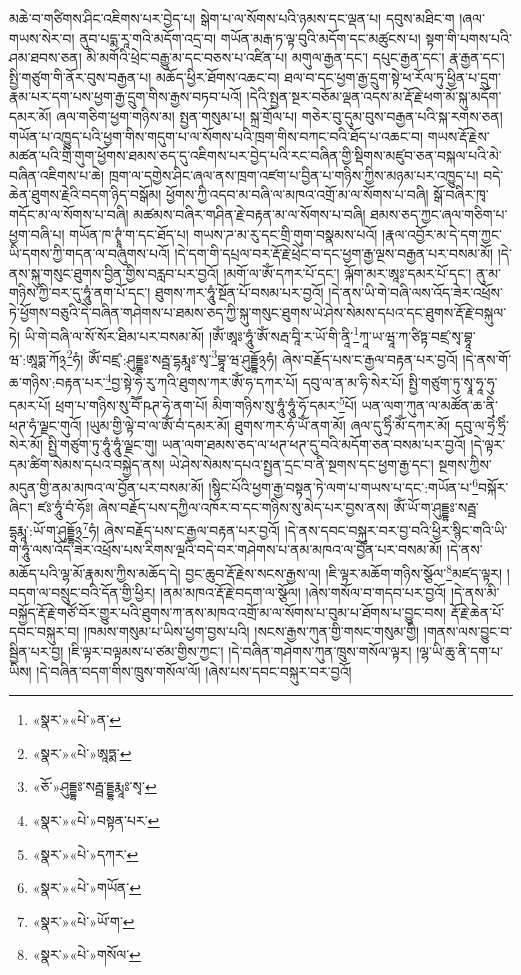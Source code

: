 མཆེ་བ་གཙིགས་ཤིང་འཇིགས་པར་བྱེད་པ། སྒེག་པ་ལ་སོགས་པའི་ཉམས་དང་ལྡན་པ། དབུས་མཐིང་ག །ཞལ་གཡས་སེར་བ། ནུབ་པདྨ་རཱ་གའི་མདོག་འདྲ་བ། གཡོན་མརྒ་ཏ་ལྟ་བུའི་མདོག་དང་མཚུངས་པ། སྟག་གི་པགས་པའི་ཤམ་ཐབས་ཅན། མི་མགོའི་ཕྲེང་བརྒྱུ་མ་དང་བཅས་པ་འཛིན་པ། མགུལ་རྒྱན་དང་། དཔུང་རྒྱན་དང་། རྣ་རྒྱན་དང་། སྤྱི་གཙུག་གི་ནོར་བུས་བརྒྱན་པ། མཆོད་ཕྱིར་ཐོགས་འཆང་བ། ཐལ་བ་དང་ཕྱག་རྒྱ་དྲུག་སྟེ་ཕ་རོལ་ཏུ་ཕྱིན་པ་དྲུག་རྣམ་པར་དག་པས་ཕྱག་རྒྱ་དྲུག་གིས་རྒྱས་བཏབ་པའོ། །དེའི་སྤྱན་སྔར་བཅོམ་ལྡན་འདས་མ་རྡོ་རྗེ་ཕག་མོ་སྐུ་མདོག་དམར་མོ། ཞལ་གཅིག་ཕྱག་གཉིས་མ། སྤྱན་གསུམ་པ། སྐྲ་གྲོལ་པ། གཅེར་བུ་དུམ་བུས་བརྒྱན་པའི་སྐ་རགས་ཅན། གཡོན་པ་འཁྱུད་པའི་ཕྱག་གིས་གདུག་པ་ལ་སོགས་པའི་ཁྲག་གིས་བཀང་བའི་ཐོད་པ་འཆང་བ། གཡས་རྡོ་རྗེས་མཚན་པའི་གྲི་གུག་ཕྱོགས་ཐམས་ཅད་དུ་འཇིགས་པར་བྱེད་པའི་རང་བཞིན་གྱི་སྡིགས་མཛུབ་ཅན་བསྐལ་པའི་མེ་བཞིན་འཇིགས་པ་ཆེ། ཁྲག་ལ་དགྱེས་ཤིང་ཞལ་ནས་ཁྲག་འཛག་པ་བྱིན་པ་གཉིས་ཀྱིས་མཉམ་པར་འཁྱུད་པ། བདེ་ཆེན་ཐུགས་རྗེའི་བདག་ཉིད་བསྒོམ། ཕྱོགས་ཀྱི་འདབ་མ་བཞི་ལ་མཁའ་འགྲོ་མ་ལ་སོགས་པ་བཞི། སྒོ་བཞིར་ཁྭ་གདོང་མ་ལ་སོགས་པ་བཞི། མཚམས་བཞིར་གཤིན་རྗེ་བརྟན་མ་ལ་སོགས་པ་བཞི། ཐམས་ཅད་ཀྱང་ཞལ་གཅིག་པ་ཕྱག་བཞི་པ། གཡོན་ཁ་ཊྭཱཾ་ག་དང་ཐོད་པ། གཡས་ཌ་མ་རུ་དང་གྲི་གུག་བསྣམས་པའོ། །རྣལ་འབྱོར་མ་དེ་དག་ཀྱང་ཡི་དགས་ཀྱི་གདན་ལ་བཞུགས་པའོ། །དེ་དག་གི་དཔྲལ་བར་རྡོ་རྗེ་ཕྲེང་བ་དང་ཕྱག་རྒྱ་ལྔས་བརྒྱན་པར་བསམ་མོ། །དེ་ནས་སྐུ་གསུང་ཐུགས་བྱིན་གྱིས་བརླབ་པར་བྱའོ། །མགོ་ལ་ཨོཾ་དཀར་པོ་དང་། ལྐོག་མར་ཨཱཿ་དམར་པོ་དང་། ནུ་མ་གཉིས་ཀྱི་བར་དུ་ཧཱུཾ་ནག་པོ་དང་། ཐུགས་ཀར་ཧཱུཾ་སྔོན་པོ་བསམ་པར་བྱའོ། །དེ་ནས་ཡི་གེ་བཞི་ལས་འོད་ཟེར་འཕྲོས་ཏེ་ཕྱོགས་བཅུའི་དེ་བཞིན་གཤེགས་པ་ཐམས་ཅད་ཀྱི་སྐུ་གསུང་ཐུགས་ཡེ་ཤེས་སེམས་དཔའ་དང་ཐུགས་རྡོ་རྗེ་བསྐུལ་ཏེ། ཡི་གེ་བཞི་ལ་སོ་སོར་ཐིམ་པར་བསམ་མོ། །ཨོཾ་ཨཱཿ་ཧཱུཾ་ཨོཾ་སརྦ་བཱི་ར་ཡོ་གི་ནཱི་\footnote{«སྣར་»«པེ་»ན་}ཀཱ་ཡ་ཝཱ་ཀ་ཙིཏྟ་བཛྲ་སྭ་བྷཱ་ཝ་:ཨཱཏྨ་ཀོ྅\footnote{«སྣར་»«པེ་»ཨཱཏྨ་}ཧཾ། ཨོཾ་བཛྲ་:ཤུདྡྷཿ་སརྦྦ་དྷརྨཱཿ་སྭ་\footnote{«ཅོ་»ཤུདྡྷཿ་སརྦྦ་དྡྷརྨཱཿ་སྭ་}བྷཱ་ཝ་ཤུདྡྷོ྅ཧཾ། ཞེས་བརྗོད་པས་ང་རྒྱལ་བརྟན་པར་བྱའོ། །དེ་ནས་གོ་ཆ་གཉིས་:བརྟན་པར་\footnote{«སྣར་»«པེ་»བསྟན་པར་}བྱ་སྟེ་ཧེ་རུ་ཀའི་ཐུགས་ཀར་ཨོཾ་ཧ་དཀར་པོ། དབུ་ལ་ན་མ་ཧི་སེར་པོ། སྤྱི་གཙུག་ཏུ་སྭཱ་ཧཱ་ཧུ་དམར་པོ། ཕྲག་པ་གཉིས་སུ་བཽ་ཥཊ་ཧེ་ནག་པོ། མིག་གཉིས་སུ་ཧཱུཾ་ཧཱུཾ་ཧོ་དམར་\footnote{«སྣར་»«པེ་»དཀར་}པོ། ཡན་ལག་ཀུན་ལ་མཚོན་ཆ་ནི་ཕཊ་ཧཾ་ལྗང་གུའོ། །ཡུམ་གྱི་ལྟེ་བ་ལ་ཨོཾ་བཾ་དམར་མོ། ཐུགས་ཀར་ཧཾ་ཡོཾ་ནག་མོ། ཞལ་དུ་ཧྲིཾ་མོཾ་དཀར་མོ། དབུ་ལ་ཧྲེཾ་ཧྲིཾ་སེར་མོ། སྤྱི་གཙུག་ཏུ་ཧཱུཾ་ཧཱུཾ་ལྗང་གུ། ཡན་ལག་ཐམས་ཅད་ལ་ཕཊ་ཕཊ་དུ་བའི་མདོག་ཅན་བསམ་པར་བྱའོ། །དེ་ལྟར་དམ་ཚིག་སེམས་དཔའ་བསྐྱེད་ནས། ཡེ་ཤེས་སེམས་དཔའ་སྤྱན་དྲང་བ་ནི་སྔགས་དང་ཕྱག་རྒྱ་དང་། སྔགས་ཀྱིས་མདུན་གྱི་ནམ་མཁའ་ལ་བྱོན་པར་བསམ་མོ། །སྙིང་པོའི་ཕྱག་རྒྱ་བསྟན་ཏེ་ལག་པ་གཡས་པ་དང་:གཡོན་པ་\footnote{«སྣར་»«པེ་»གཡོན་}བསྐོར་ཞིང་། ཛཿ་ཧཱུཾ་བཾ་ཧོཿ། ཞེས་བརྗོད་པས་དཀྱིལ་འཁོར་བ་དང་གཉིས་སུ་མེད་པར་བྱས་ནས། ཨོཾ་ཡོ་ག་ཤུདྡྷཿ་སརྦྦ་དྷརྨཱ་:ཡོ་ག་ཤུདྡྷོ྅\footnote{«སྣར་»«པེ་»ཡོ་ག་}ཧཾ། ཞེས་བརྗོད་པས་ང་རྒྱལ་བརྟན་པར་བྱའོ། །དེ་ནས་དབང་བསྐུར་བར་བྱ་བའི་ཕྱིར་སྙིང་གའི་ཡི་གེ་ཧཱུཾ་ལས་འོད་ཟེར་འཕྲོས་པས་རིགས་ལྔའི་བདེ་བར་གཤེགས་པ་ནམ་མཁའ་ལ་བྱོན་པར་བསམ་མོ། །དེ་ནས་མཆོད་པའི་ལྷ་མོ་རྣམས་ཀྱིས་མཆོད་དེ། བྱང་ཆུབ་རྡོ་རྗེས་སངས་རྒྱས་ལ། །ཇི་ལྟར་མཆོག་གཉིས་སྩོལ་\footnote{«སྣར་»«པེ་»གསོལ་}མཛད་ལྟར། །བདག་ལ་བསྲུང་བའི་དོན་གྱི་ཕྱིར། །ནམ་མཁའ་རྡོ་རྗེ་བདག་ལ་སྩོལ། །ཞེས་གསོལ་བ་གདབ་པར་བྱའོ། །དེ་ནས་མི་བསྐྱོད་རྡོ་རྗེ་གཙོ་བོར་གྱུར་པའི་ཐུགས་ཀ་ནས་མཁའ་འགྲོ་མ་ལ་སོགས་པ་བུམ་པ་ཐོགས་པ་བྱུང་བས། རྡོ་རྗེ་ཆེན་པོ་དབང་བསྐུར་བ། །ཁམས་གསུམ་པ་ཡིས་ཕྱག་བྱས་པའི། །སངས་རྒྱས་ཀུན་གྱི་གསང་གསུམ་གྱི། །གནས་ལས་བྱུང་བ་སྦྱིན་པར་བྱ། །ཇི་ལྟར་བལྟམས་པ་ཙམ་གྱིས་ཀྱང་། །དེ་བཞིན་གཤེགས་ཀུན་ཁྲུས་གསོལ་ལྟར། །ལྷ་ཡི་ཆུ་ནི་དག་པ་ཡིས། །དེ་བཞིན་བདག་གིས་ཁྲུས་གསོལ་ལོ། །ཞེས་པས་དབང་བསྐུར་བར་བྱའོ། 